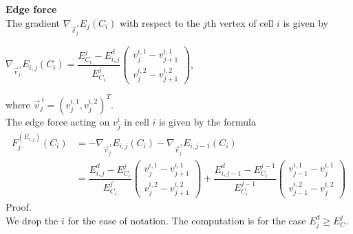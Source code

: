 \begin{proposition} \textbf{Edge force} \\
	The gradient $\nabla_{\vec{v}^{\: i}_j} E_j(C_i)$ with respect to the $j$th vertex of cell $i$ is given by 
	\begin{center}
		$\nabla_{\vec{v}^{\: i}_j} E_{i,j}(C_i) = \dfrac{E^j_{C_i} - E^d_{i,j}}{E^j_{C_i}}  \begin{pmatrix} v_{j}^{i,1} - v_{j+1}^{i,1} \\[0.5em]  v_{j}^{i,2} - v_{j+1}^{i,2} \end{pmatrix}$, 
	\end{center}
	where $\vec{v}^{\: i}_j = (v_{j}^{i,1}, v_{j}^{i,2})^T$. \\

	The edge force acting on $v_j^i$ in cell $i$ is given by the formula
	\begin{align}
		F^{(E_{i,j})}_j(C_i) &= - \nabla_{\vec{v}^{\: i}_j} E_{i,j}(C_i) - \nabla_{\vec{v}^{\: i}_j} E_{i,j-1}(C_i) \\
		&= \dfrac{ E^d_{i,j} - E^j_{C_i}}{E^j_{C_i}}  \begin{pmatrix} v_{j}^{i,1} - v_{j+1}^{i,1} \\[0.5em]  v_{j}^{i,2} - v_{j+1}^{i,2} \end{pmatrix}
		 + \dfrac{ E^d_{i,j-1} - E^{j-1}_{C_i}}{E^{j-1}_{C_i}}  \begin{pmatrix} v_{j-1}^{i,1} - v_{j}^{i,1} \\[0.5em]  v_{j-1}^{i,2} - v_{j}^{i,2} \end{pmatrix}
	\end{align}
	Proof. \\
	We drop the $i$ for the ease of notation. 
	The computation is for the case $E_j^d \geq E^j_C$. 


\end{proposition}
